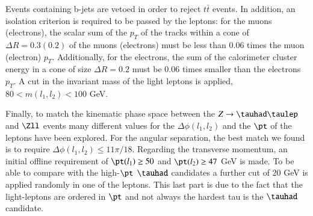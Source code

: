 Events containing b-jets are vetoed in order to reject $t\bar{t}$ events. In addition, an isolation criterion is required to be passed by the leptons: for the muons (electrons), the scalar sum of the $p_T$ of the tracks within a cone of $\Delta R=0.3 (0.2)$ of the muons (electrons) must be less than 0.06 times the muon (electron) $p_T$. Additionally, for the electrons, the sum of the calorimeter cluster energy in a cone of size $\Delta R=0.2$ must be 0.06 times smaller than the electrons $p_T$. A cut in the invariant mass of the light leptons is applied, $80<m(l_1,l_2)<100$ GeV.

Finally, to match the kinematic phase space between the $Z\to\tauhad\taulep$ and $\Zll$ events many different values for the $\Delta\phi (l_1,l_2)$ and the $\pt$ of the leptons have been explored. For the angular separation, the best match we found is to require $\Delta\phi (l_1,l_2)\leq 11\pi/18$. Regarding the transverse momentum, an initial offline requirement of $\pt(l_1)\geq 50$ and $\pt(l_2)\geq 47$ GeV is made. To be able to compare with the high-$\pt$ $\tauhad$ candidates a further cut of 20 GeV is applied randomly in one of the leptons. This last part is due to the fact that the light-leptons are ordered in $\pt$ and not always the hardest tau is the $\tauhad$ candidate.